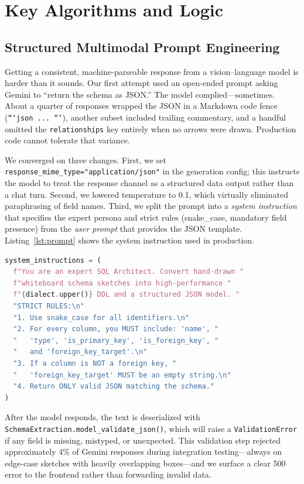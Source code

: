 \documentclass[conference]{IEEEtran}
\begin{document}
\section{Key Algorithms and Logic}

\subsection{Structured Multimodal Prompt Engineering}

Getting a consistent, machine-parseable response from a vision--language
model is harder than it sounds. Our first attempt used an open-ended
prompt asking Gemini to ``return the schema as JSON.'' The model
complied---sometimes. About a quarter of responses wrapped the JSON
in a Markdown code fence (\texttt{```json ... ```}), another subset
included trailing commentary, and a handful omitted the
\texttt{relationships} key entirely when no arrows were drawn.
Production code cannot tolerate that variance.

We converged on three changes. First, we set
\texttt{response\_mime\_type="application/json"} in the generation
config; this instructs the model to treat the response channel as a
structured data output rather than a chat turn. Second, we lowered
temperature to 0.1, which virtually eliminated paraphrasing of field
names. Third, we split the prompt into a \emph{system instruction}
that specifies the expert persona and strict rules (snake\_case,
mandatory field presence) from the \emph{user prompt} that provides
the JSON template. Listing~\ref{lst:prompt} shows the system
instruction used in production.

\begin{lstlisting}[language=Python, caption={System instruction for Gemini
  schema extraction. The dialect is substituted at call time.},
  label={lst:prompt}]
system_instructions = (
  f"You are an expert SQL Architect. Convert hand-drawn "
  f"whiteboard schema sketches into high-performance "
  f"{dialect.upper()} DDL and a structured JSON model. "
  "STRICT RULES:\n"
  "1. Use snake_case for all identifiers.\n"
  "2. For every column, you MUST include: 'name', "
  "   'type', 'is_primary_key', 'is_foreign_key', "
  "   and 'foreign_key_target'.\n"
  "3. If a column is NOT a foreign key, "
  "   'foreign_key_target' MUST be an empty string.\n"
  "4. Return ONLY valid JSON matching the schema."
)
\end{lstlisting}

After the model responds, the text is deserialized with
\texttt{SchemaExtraction.model\_validate\_json()}, which will raise a
\texttt{ValidationError} if any field is missing, mistyped, or
unexpected. This validation step rejected approximately 4\% of Gemini
responses during integration testing---always on edge-case sketches
with heavily overlapping boxes---and we surface a clear 500 error
to the frontend rather than forwarding invalid data.
\end{document}
